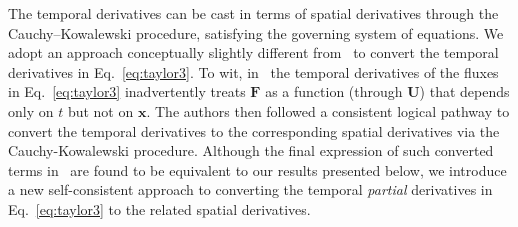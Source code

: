 \documentclass[times,preprint,3p]{elsarticle}
\newcommand{\bF}{\mathbf{F}}
\newcommand{\bU}{\mathbf{U}}
\newcommand{\bx}{\mathbf{x}}
\begin{document}
The temporal derivatives can be cast in terms of spatial derivatives
through the Cauchy–Kowalewski procedure, satisfying the governing system of equations.
We adopt an approach conceptually slightly different from~\cite{christlieb2015picard}
to convert the temporal derivatives in Eq.~\eqref{eq:taylor3}.
To wit, in~\cite{christlieb2015picard} the temporal derivatives of the fluxes
in Eq.~\eqref{eq:taylor3}
inadvertently treats $\bF$ as a function (through $\bU$) that depends only on $t$ but not on $\bx$.
The authors then followed a consistent logical pathway to convert the temporal
derivatives to the corresponding spatial derivatives via the Cauchy-Kowalewski
procedure. Although the final expression of such converted terms in~\cite{christlieb2015picard}
are found to be equivalent to our results presented below,
we introduce a new self-consistent %
approach to converting the temporal \textit{partial} derivatives  in Eq.~\eqref{eq:taylor3} to
the related spatial derivatives.
\end{document}
